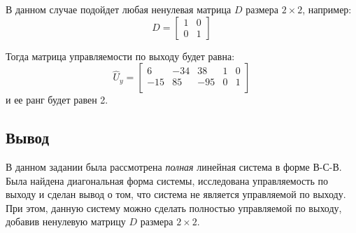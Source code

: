 В данном случае подойдет любая ненулевая матрица $D$ размера $2\times 2$, например: 
\begin{equation}
    D = \begin{bmatrix}
        1 & 0 \\
        0 & 1
    \end{bmatrix}
\end{equation}

Тогда матрица управляемости по выходу будет равна:
\begin{equation}
    \hat{U}_y = \begin{bmatrix}
        6  & -34  & 38  & 1  & 0 \\ 
        -15  & 85  & -95  & 0  & 1 \\ 
        \end{bmatrix}
\end{equation}
и ее ранг будет равен 2.

\subsection{Вывод}
В данном задании была рассмотрена \textit{полная} линейная система 
в форме В-С-В. Была найдена диагональная форма системы, исследована управляемость
по выходу и сделан вывод о том, что система не является управляемой по выходу. 
При этом, данную систему можно сделать полностью управляемой по выходу, добавив
ненулевую матрицу $D$ размера $2\times 2$. 